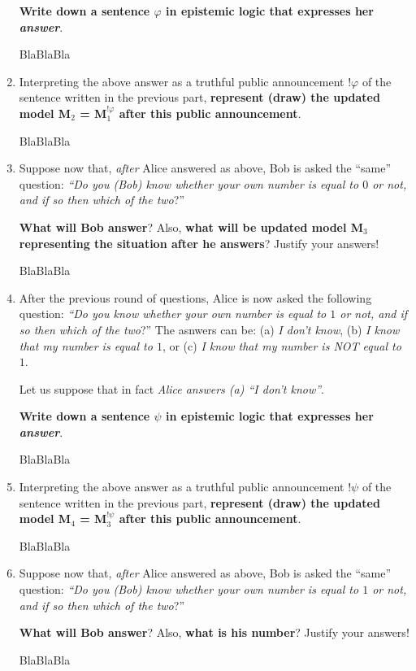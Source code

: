 \documentclass[leqno]{article}
\begin{document}
\begin{enumerate}
    \textbf{Write down a sentence $\varphi$ in epistemic logic that expresses her \textit{answer}}.
    
    BlaBlaBla
    
    \item Interpreting the above answer as a truthful public announcement $!\varphi$ of the sentence written in the previous part, \textbf{represent (draw) the updated model M$_2$ = M$_1^{!\varphi}$ after this public announcement}.
    
    BlaBlaBla
    
    \item Suppose now that, \textit{after} Alice answered as above, Bob is asked the ``same'' question: \textit{``Do you (Bob) know whether your own number is equal to $0$ or not, and if so then which of the two}?''
    
    \textbf{What will Bob answer}? Also, \textbf{what will be updated model M$_3$ representing the situation after he answers}? Justify your answers!
    
    BlaBlaBla
    
    \item After the previous round of questions, Alice is now asked the following question: \textit{``Do you know whether your own number is equal to $1$ or not, and if so then which of the two}?'' The asnwers can be: (a) \textit{I don't know}, (b) \textit{I know that my number is equal to $1$}, or (c) \textit{I know that my number is NOT equal to $1$}.
    
	Let us suppose that in fact \textit{Alice answers (a) ``I don't know''}.
	
    \textbf{Write down a sentence $\psi$ in epistemic logic that expresses her \textit{answer}}.
    
    BlaBlaBla
    
    \item Interpreting the above answer as a truthful public announcement $!\psi$ of the sentence written in the previous part, \textbf{represent (draw) the updated model M$_4$ = M$_3^{!\psi}$ after this public announcement}.
    
    BlaBlaBla
    
    \item Suppose now that, \textit{after} Alice answered as above, Bob is asked the ``same'' question: \textit{``Do you (Bob) know whether your own number is equal to $1$ or not, and if so then which of the two}?''
    
    \textbf{What will Bob answer}? Also, \textbf{what is his number}? Justify your answers!
    
    BlaBlaBla

\end{enumerate}
\end{document}
